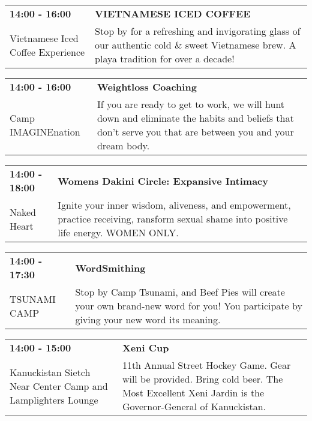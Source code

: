 \begin{tabular}{ p{1in} p{2.2in} }
    \textbf{14:00 - 16:00} & \textbf{VIETNAMESE ICED COFFEE} \\
    Vietnamese Iced Coffee Experience \newline  & Stop by for a refreshing and invigorating glass of our authentic cold \& sweet Vietnamese brew. A playa tradition for over a decade! \\
    \hline 
\end{tabular}
    
\begin{tabular}{ p{1in} p{2.2in} }
    \textbf{14:00 - 16:00} & \textbf{Weightloss Coaching} \\
    Camp IMAGINEnation \newline  & If you are ready to get to work, we will hunt down and eliminate the habits and beliefs that don't serve you that are between you and your dream body. \\
    \hline 
\end{tabular}
    
\begin{tabular}{ p{1in} p{2.2in} }
    \textbf{14:00 - 18:00} & \textbf{Womens Dakini Circle: Expansive Intimacy} \\
    Naked Heart \newline  & Ignite your inner wisdom, aliveness, and empowerment, practice receiving, ransform sexual shame into positive life energy. WOMEN ONLY. \\
    \hline 
\end{tabular}
    
\begin{tabular}{ p{1in} p{2.2in} }
    \textbf{14:00 - 17:30} & \textbf{WordSmithing} \\
    TSUNAMI CAMP \newline  & Stop by Camp Tsunami, and Beef Pies will create your own brand-new word for you! You participate by giving your new word its meaning. \\
    \hline 
\end{tabular}
    
\begin{tabular}{ p{1in} p{2.2in} }
    \textbf{14:00 - 15:00} & \textbf{Xeni Cup} \\
    Kanuckistan Sietch \newline Near Center Camp and Lamplighters Lounge & 11th Annual Street Hockey Game. Gear will be provided. Bring cold beer. The Most Excellent Xeni Jardin is the Governor-General of Kanuckistan. \\
    \hline 
\end{tabular}
    
